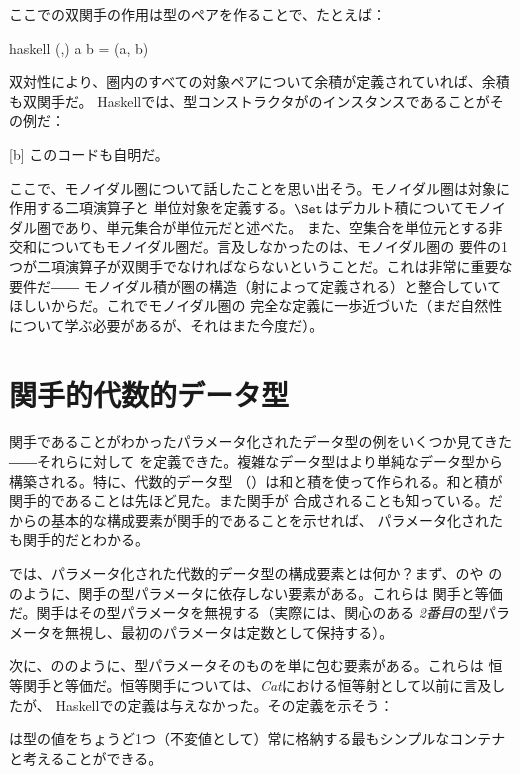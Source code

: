 ここでの双関手の作用は型のペアを作ることで、たとえば：

\begin{snip}{haskell}
(,) a b = (a, b)
\end{snip}
双対性により、圏内のすべての対象ペアについて余積が定義されていれば、余積も双関手だ。
Haskellでは、型コンストラクタがのインスタンスであることがその例だ：

[b]
このコードも自明だ。

ここで、モノイダル圏について話したことを思い出そう。モノイダル圏は対象に作用する二項演算子と
単位対象を定義する。$\Set$はデカルト積についてモノイダル圏であり、単元集合が単位元だと述べた。
また、空集合を単位元とする非交和についてもモノイダル圏だ。言及しなかったのは、モノイダル圏の
要件の1つが二項演算子が双関手でなければならないということだ。これは非常に重要な要件だ――
モノイダル積が圏の構造（射によって定義される）と整合していてほしいからだ。これでモノイダル圏の
完全な定義に一歩近づいた（まだ自然性について学ぶ必要があるが、それはまた今度だ）。

\section{関手的代数的データ型}

関手であることがわかったパラメータ化されたデータ型の例をいくつか見てきた――それらに対して
を定義できた。複雑なデータ型はより単純なデータ型から構築される。特に、代数的データ型
（）は和と積を使って作られる。和と積が関手的であることは先ほど見た。また関手が
合成されることも知っている。だからの基本的な構成要素が関手的であることを示せれば、
パラメータ化されたも関手的だとわかる。

では、パラメータ化された代数的データ型の構成要素とは何か？まず、のや
ののように、関手の型パラメータに依存しない要素がある。これらは
関手と等価だ。関手はその型パラメータを無視する（実際には、関心のある
\emph{2番目}の型パラメータを無視し、最初のパラメータは定数として保持する）。

次に、ののように、型パラメータそのものを単に包む要素がある。これらは
恒等関手と等価だ。恒等関手については、\emph{Cat}における恒等射として以前に言及したが、
Haskellでの定義は与えなかった。その定義を示そう：


は型の値をちょうど1つ（不変値として）常に格納する最もシンプルなコンテナ
と考えることができる。

